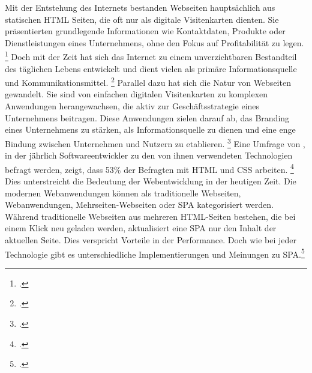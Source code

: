 

Mit der Entstehung des Internets bestanden Webseiten hauptsächlich aus statischen \ac{HTML} Seiten, die oft nur als digitale Visitenkarten dienten. 
Sie präsentierten grundlegende Informationen wie Kontaktdaten, Produkte oder Dienstleistungen eines Unternehmens, ohne den Fokus auf Profitabilität zu legen. \footcite[vgl.][Seite 1]{Bly2018}
Doch mit der Zeit hat sich das Internet zu einem unverzichtbaren Bestandteil des täglichen Lebens entwickelt und dient vielen als primäre Informationsquelle und Kommunikationsmittel. \footcite[vgl.][Seite 1]{conf/pi/Sassenberg}
Parallel dazu hat sich die Natur von Webseiten gewandelt. 
Sie sind von einfachen digitalen Visitenkarten zu komplexen Anwendungen herangewachsen, die aktiv zur Geschäftsstrategie eines Unternehmens beitragen. 
Diese Anwendungen zielen darauf ab, das Branding eines Unternehmens zu stärken, als Informationsquelle zu dienen und eine enge Bindung zwischen Unternehmen und Nutzern zu etablieren. \footcite[vgl.][Seite 1]{Bly2018}
Eine Umfrage von , in der jährlich Softwareentwickler zu den von ihnen verwendeten Technologien befragt werden, zeigt, dass 53\% der Befragten mit \ac{HTML} und \ac{CSS} arbeiten. \footcite[Vgl.][most-popular-technologies-programming-scripting-and-markup-languages]{StackOverflow2023}
Dies unterstreicht die Bedeutung der Webentwicklung in der heutigen Zeit.
Die modernen Webanwendungen können als traditionelle Webseiten, Webanwendungen, Mehrseiten-Webseiten oder \ac{SPA} kategorisiert werden. 
Während traditionelle Webseiten aus mehreren \ac{HTML}-Seiten bestehen, die bei einem Klick neu geladen werden, aktualisiert eine \ac{SPA} nur den Inhalt der aktuellen Seite. 
Dies verspricht Vorteile in der Performance. Doch wie bei jeder Technologie gibt es unterschiedliche Implementierungen und Meinungen zu \ac{SPA}.\footcite[vgl.][Seite 4]{Flanagan2011}

